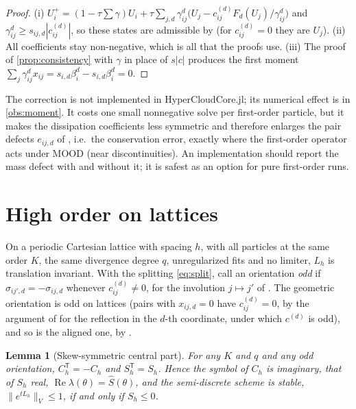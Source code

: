 \documentclass[11pt,a4paper]{article}
\theoremstyle{plain}
\newtheorem{lemma}[theorem]{Lemma}
\theoremstyle{definition}
\theoremstyle{remark}
\numberwithin{equation}{section}
\renewcommand{\Re}{\operatorname{Re}}
\newcommand{\A}[1]{\cite[#1]{Addendum}}
\begin{document}
\begin{proof}
(i) $U^+_i=(1-\tau\sum\gamma)U_i+\tau\sum_{j,d}\gamma^d_{ij}\big(U_j-c^{(d)}_{ij}F_d(U_j)/\gamma^d_{ij}\big)$ and $\gamma^d_{ij}\ge s_{ij,d}|c^{(d)}_{ij}|$, so these states are admissible by \A{Lem.~5.1} (for $c^{(d)}_{ij}=0$ they are $U_j$). (ii) All coefficients stay non-negative, which is all that the proofs use. (iii) The proof of \cref{prop:consistency} with $\gamma$ in place of $s|c|$ produces the first moment $\sum_j\gamma^d_{ij}x_{ij}=s_{i,d}\beta^d_i-s_{i,d}\beta^d_i=0$.
\end{proof}

The correction is not implemented in HyperCloudCore.jl; its numerical effect is in \cref{obs:moment}. It costs one small nonnegative solve per first-order particle, but it makes the dissipation coefficients less symmetric and therefore enlarges the pair defects $e_{ij,d}$ of \A{Prop.~4.4}, i.e.\ the conservation error, exactly where the first-order operator acts under MOOD (near discontinuities). An implementation should report the mass defect with and without it; it is safest as an option for pure first-order runs.

\section{High order on lattices}\label{sec:lattice}

On a periodic Cartesian lattice with spacing $h$, with all particles at the same order $K$, the same divergence degree $q$, unregularized fits and no limiter, $L_h$ is translation invariant. With the splitting \eqref{eq:split}, call an orientation \emph{odd} if $\sigma_{ij',d}=-\sigma_{ij,d}$ whenever $c^{(d)}_{ij}\ne0$, for the involution $j\mapsto j'$ of \A{Def.~3.6}. The geometric orientation is odd on lattices (pairs with $x_{ij,d}=0$ have $c^{(d)}_{ij}=0$, by the argument of \A{Lem.~3.7(i)} for the reflection in the $d$-th coordinate, under which $c^{(d)}$ is odd), and so is the aligned one, by \A{Lem.~3.7(i)}.

\begin{lemma}[Skew-symmetric central part]\label{lem:skew}
For any $K$ and $q$ and any odd orientation, $C_h^{\mathsf T}=-C_h$ and $S_h^{\mathsf T}=S_h$. Hence the symbol of $C_h$ is imaginary, that of $S_h$ real, $\Re\lambda(\theta)=\hat S(\theta)$, and the semi-discrete scheme is stable, $\|e^{tL_h}\|_V\le1$, if and only if $S_h\le0$.
\end{lemma}
\end{document}
